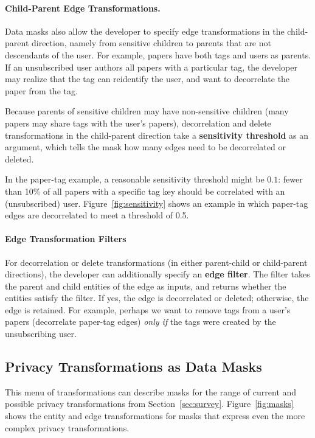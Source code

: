 \paragraph{Child-Parent Edge Transformations.}
Data masks also allow the developer to specify edge transformations in the child-parent direction,
namely from sensitive children to parents that are not descendants of the user. 
%
For example, papers have both tags and users as parents. If an unsubscribed user authors all papers
with a particular tag, the developer may realize that the tag can reidentify the user, and want to
decorrelate the paper from the tag.

Because parents of sensitive children may have non-sensitive children (\eg many papers may share
tags with the user's papers), decorrelation and delete transformations in the child-parent direction 
take a \textbf{sensitivity threshold} as an argument, which tells the mask how many edges need to be
decorrelated or deleted.

In the paper-tag example, a reasonable sensitivity threshold
might be $0.1$: fewer than 10\% of all papers with a specific tag key should be correlated with an
(unsubscribed) user.  Figure~\ref{fig:sensitivity} shows an example in which paper-tag edges are
decorrelated to meet a threshold of 0.5.

\paragraph{Edge Transformation Filters}
For decorrelation or delete transformations (in either parent-child or child-parent directions), the
developer can additionally specify an \textbf{edge filter}. The filter takes the parent and child
entities of the edge as inputs, and returns whether the entities satisfy the filter. If yes, the
edge is decorrelated or deleted; otherwise, the edge is retained. 
%
For example, perhaps we want to remove tags from a user's papers (decorrelate paper-tag edges)
\emph{only if} the tags were created by the unsubscribing user.

\subsection{Privacy Transformations as Data Masks}
This menu of transformations can describe masks for the range of current and possible privacy
transformations from Section~\ref{sec:survey}. Figure~\ref{fig:masks} shows the entity and edge transformations for masks
that express even the more complex privacy transformations.

